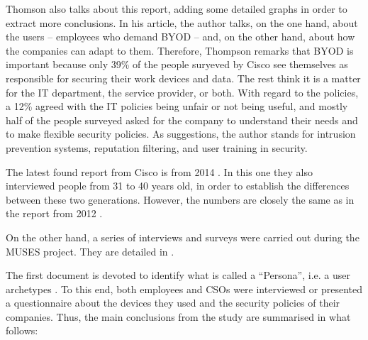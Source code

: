 Thomson \cite{thomson2012byod} also talks about this report, adding some detailed graphs in order to extract more conclusions. In his article, the author talks, on the one hand, about the users -- employees who demand BYOD -- and, on the other hand, about how the companies can adapt to them. Therefore, Thompson remarks that BYOD is important because only 39\% of the people suryeved by Cisco see themselves as responsible for securing their work devices and data. The rest think it is a matter for the IT department, the service provider, or both. With regard to the policies, a 12\% agreed with the IT policies being unfair or not being useful, and mostly half of the people surveyed asked for the company to understand their needs and to make flexible security policies. As suggestions, the author stands for intrusion prevention systems, reputation filtering, and user training in security.

The latest found report from Cisco is from 2014 \cite{cisco2014}. In this one they also interviewed people from 31 to 40 years old, in order to establish the differences between these two generations. However, the numbers are closely the same as in the report from 2012 \cite{cisco2012}.

On the other hand, a series of interviews and surveys were carried out during the MUSES project. They are detailed in \cite{musesD41, musesD42}.

The first document is devoted to identify what is called a ``Persona'', i.e. a user archetypes \cite{adlin2010essential}. To this end, both employees and CSOs were interviewed or presented a questionnaire about the devices they used and the security policies of their companies. Thus, the main conclusions from the study are summarised in what follows:

